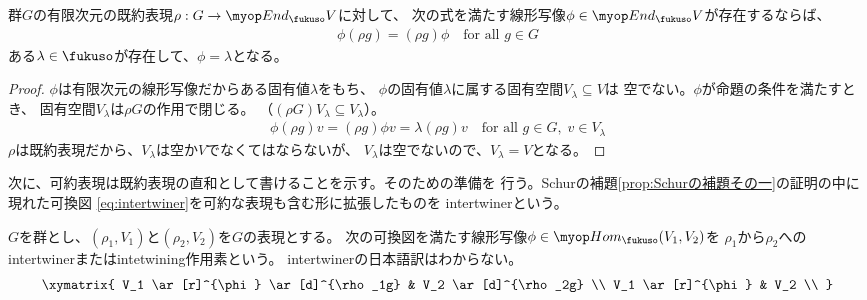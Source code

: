 	\begin{proposition}[Schurの補題その二]\label{prop:Schurの補題その二} %
		群$G$の有限次元の既約表現$\rho:G\to \End_\fukuso V$に対して、
		次の式を満たす線形写像$\phi\in\End_\fukuso V$が存在するならば、
		\begin{equation*}\begin{split} %
			\phi(\rho g) = (\rho g)\phi \quad\text{for all }g\in G
		\end{split}\end{equation*} %
		ある$\lambda\in\fukuso$が存在して、$\phi=\lambda$となる。
	\end{proposition} %
	\begin{proof} %
		$\phi$は有限次元の線形写像だからある固有値$\lambda$をもち、
		$\phi$の固有値$\lambda$に属する固有空間$V_\lambda\subseteq V$は
		空でない。$\phi$が命題の条件を満たすとき、
		固有空間$V_\lambda$は$\rho G$の作用で閉じる。
		（$(\rho G)V_\lambda\subseteq V_\lambda$）。
		\begin{equation*}\begin{split} %
			\phi(\rho g)v = (\rho g)\phi v = \lambda(\rho g) v
			\quad\text{for all }g\in G,\;v\in V_\lambda
		\end{split}\end{equation*} %
		$\rho$は既約表現だから、$V_\lambda$は空か$V$でなくてはならないが、
		$V_\lambda$は空でないので、$V_\lambda=V$となる。
	\end{proof} %

	次に、可約表現は既約表現の直和として書けることを示す。そのための準備を
	行う。Schurの補題\ref{prop:Schurの補題その一}の証明の中に現れた可換図
	\eqref{eq:intertwiner}を可約な表現も含む形に拡張したものを
	intertwinerという。

	\begin{definition}[intertwiner]\label{def:intertwiner} %
		$G$を群とし、$(\rho_1,V_1)$と$(\rho_2,V_2)$を$G$の表現とする。
		次の可換図を満たす線形写像$\phi\in\Hom_\fukuso(V_1,V_2)$を
		$\rho_1$から$\rho_2$へのintertwinerまたはintetwining作用素という。
		intertwinerの日本語訳はわからない。
		\begin{equation*}\xymatrix{
			V_1 \ar[r]^{\phi} \ar[d]^{\rho_1g} & V_2 \ar[d]^{\rho_2g} \\
			V_1 \ar[r]^{\phi} & V_2 \\
		}\end{equation*}
	\end{definition} %


